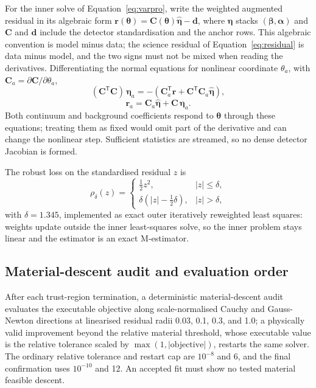 For the inner solve of Equation~\ref{eq:varpro}, write the weighted
augmented residual in its algebraic form
$\bm{r}(\bm{\theta})=\bm{C}(\bm{\theta})\widehat{\bm{\eta}}-\bm{d}$, where
$\bm{\eta}$ stacks $(\bm{\beta},\bm{\alpha})$ and $\bm{C}$ and $\bm{d}$
include the detector standardisation and the anchor rows. This algebraic
convention is model minus data; the science residual of
Equation~\ref{eq:residual} is data minus model, and the two signs must
not be mixed when reading the derivatives. Differentiating the normal
equations for nonlinear coordinate $\theta_a$, with
$\bm{C}_a=\partial\bm{C}/\partial\theta_a$,
\begin{equation}
 (\bm{C}^{\mathsf T}\bm{C})\,\bm{\eta}_a
 =-\left(\bm{C}_a^{\mathsf T}\bm{r}
 +\bm{C}^{\mathsf T}\bm{C}_a\widehat{\bm{\eta}}\right),
\end{equation}
\begin{equation}
 \bm{r}_a=\bm{C}_a\widehat{\bm{\eta}}+\bm{C}\,\bm{\eta}_a .
\end{equation}
Both continuum and background coefficients respond to $\bm{\theta}$
through these equations; treating them as fixed would omit part of the
derivative and can change the nonlinear step. Sufficient statistics are
streamed, so no dense detector Jacobian is formed.

The robust loss on the standardised residual $z$ is
\begin{equation}
 \rho_{\delta}(z)=
 \begin{cases}
  \tfrac{1}{2}z^2, & |z|\leq\delta,\\
  \delta\left(|z|-\tfrac{1}{2}\delta\right), & |z|>\delta,
 \end{cases}
\end{equation}
with $\delta=1.345$, implemented as exact outer iteratively reweighted
least squares: weights update outside the inner least-squares solve, so
the inner problem stays linear and the estimator is an exact M-estimator.

\subsection{Material-descent audit and evaluation order}

After each trust-region termination, a deterministic material-descent
audit evaluates the executable objective along scale-normalised Cauchy
and Gauss-Newton directions at linearised residual radii 0.03, 0.1, 0.3,
and 1.0; a physically valid improvement beyond the relative material
threshold, whose executable value is the relative tolerance scaled by
$\max(1,|\mathrm{objective}|)$, restarts the same solver. The ordinary
relative tolerance and restart cap are $10^{-8}$ and 6, and the final
confirmation uses $10^{-10}$ and 12. An accepted fit must show no tested
material feasible descent.

